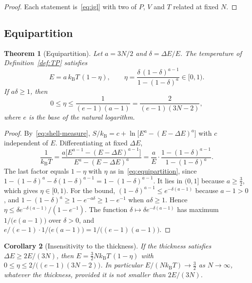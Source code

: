 \documentclass[11pt,a4paper]{article}
\newtheorem{theorem}{Theorem}[section]
\newtheorem{corollary}[theorem]{Corollary}
\theoremstyle{definition}
\theoremstyle{remark}
\newcommand{\kB}{k_{\mathrm{B}}}
\begin{document}
\begin{proof}
Each statement is~\eqref{eq:igl} with two of $P$, $V$ and $T$ related at fixed $N$.
\end{proof}

\subsection{Equipartition}

\begin{theorem}[Equipartition]
\label{thm:equipartition}
Let $a=3N/2$ and $\delta=\Delta E/E$.
The temperature of Definition~\ref{def:TP} satisfies
\begin{equation}
E=a\,\kB T\,(1-\eta),\qquad
\eta=\frac{\delta\,(1-\delta)^{a-1}}{1-(1-\delta)^{a}}\in[0,1).
\label{eq:equipartition}
\end{equation}
If $a\delta\ge1$, then
\begin{equation}
0\le\eta\le\frac{1}{(e-1)(a-1)}=\frac{2}{(e-1)(3N-2)},
\label{eq:eta-bound}
\end{equation}
where $e$ is the base of the natural logarithm.
\end{theorem}

\begin{proof}
By~\eqref{eq:shell-measure}, $S/\kB=c+\ln\bigl[E^{a}-(E-\Delta E)^{a}\bigr]$ with $c$ independent of $E$.
Differentiating at fixed $\Delta E$,
\[
\frac{1}{\kB T}=\frac{a\bigl[E^{a-1}-(E-\Delta E)^{a-1}\bigr]}{E^{a}-(E-\Delta E)^{a}}=\frac aE\cdot\frac{1-(1-\delta)^{a-1}}{1-(1-\delta)^{a}}.
\]
The last factor equals $1-\eta$ with $\eta$ as in~\eqref{eq:equipartition}, since $1-(1-\delta)^{a}-\delta(1-\delta)^{a-1}=1-(1-\delta)^{a-1}$.
It lies in $(0,1]$ because $a\ge\tfrac32$, which gives $\eta\in[0,1)$.
For the bound, $(1-\delta)^{a-1}\le e^{-\delta(a-1)}$ because $a-1>0$, and $1-(1-\delta)^{a}\ge1-e^{-a\delta}\ge1-e^{-1}$ when $a\delta\ge1$.
Hence $\eta\le\delta e^{-\delta(a-1)}/(1-e^{-1})$.
The function $\delta\mapsto\delta e^{-\delta(a-1)}$ has maximum $1/\bigl(e(a-1)\bigr)$ over $\delta>0$, and $e/(e-1)\cdot1/\bigl(e(a-1)\bigr)=1/\bigl((e-1)(a-1)\bigr)$.
\end{proof}

\begin{corollary}[Insensitivity to the thickness]
\label{cor:shell-insensitive}
If the thickness satisfies $\Delta E\ge2E/(3N)$, then $E=\tfrac32N\kB T\,(1-\eta)$ with $0\le\eta\le2/\bigl((e-1)(3N-2)\bigr)$.
In particular $E/(N\kB T)\to\tfrac32$ as $N\to\infty$, whatever the thickness, provided it is not smaller than $2E/(3N)$.
\end{corollary}
\end{document}
